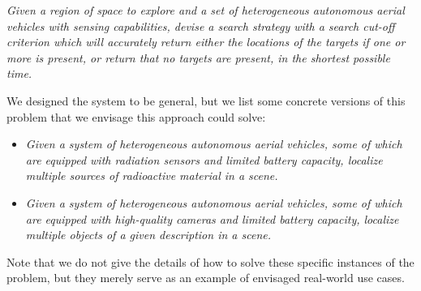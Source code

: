 \textit{Given a region of space to explore and a set of heterogeneous autonomous aerial vehicles with sensing capabilities, devise a search strategy with a search cut-off criterion which will accurately return either the locations of the targets if one or more is present, or return that no targets are present, in the shortest possible time.} \par

We designed the system to be general, but we list some concrete versions of this problem that we envisage this approach could solve:
\begin{itemize}
    \item \textit{Given a system of heterogeneous autonomous aerial vehicles, some of which are equipped with radiation sensors and limited battery capacity, localize multiple sources of radioactive material in a scene.}
    \item \textit{Given a system of heterogeneous autonomous aerial vehicles, some of which are equipped with high-quality cameras and limited battery capacity, localize multiple objects of a given description in a scene.}
\end{itemize}
Note that we do not give the details of how to solve these specific instances of the problem, but they merely serve as an example of envisaged real-world use cases.
\par


